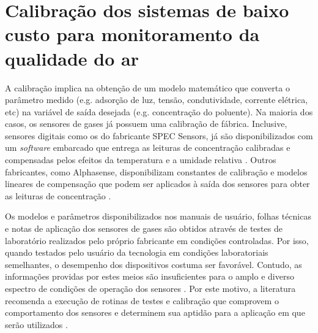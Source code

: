 \section{Calibração dos sistemas de baixo custo para monitoramento da qualidade do ar}\label{section:monit-low-cost-calib}

A calibração implica na obtenção de um modelo matemático que converta o parâmetro medido (e.g. adsorção de luz, tensão, condutividade, corrente elétrica, etc) na variável de saída desejada (e.g. concentração do poluente). Na maioria dos casos, os sensores de gases já possuem uma calibração de fábrica. Inclusive, sensores digitais como os do fabricante SPEC Sensors, já são disponibilizados com um \textit{software} embarcado que entrega as leituras de concentração calibradas e compensadas pelos efeitos da temperatura e a umidade relativa \cite{SPECSensors2017Digital968-045}. Outros fabricantes, como Alphasense, disponibilizam constantes de calibração e modelos lineares de compensação que podem ser aplicados à saída dos sensores para obter as leituras de concentração \cite{Alphasense2019AlphasenseSensors}.

Os modelos e parâmetros disponibilizados nos manuais de usuário, folhas técnicas e notas de aplicação dos sensores de gases são obtidos através de testes de laboratório realizados pelo próprio fabricante em condições controladas. Por isso, quando testados pelo usuário da tecnologia em condições laboratoriais semelhantes, o desempenho dos dispositivos costuma ser favorável. Contudo, as informações providas por estes meios são insuficientes para o amplo e diverso espectro de condições de operação dos sensores \cite{Morawska2018ApplicationsGone}. Por este motivo, a literatura recomenda a execução de rotinas de testes e calibração que comprovem o comportamento dos sensores e determinem sua aptidão para a aplicação em que serão utilizados \cite{Williams2014AirGuidebook,Lewis2018Low-costApplications}. 

